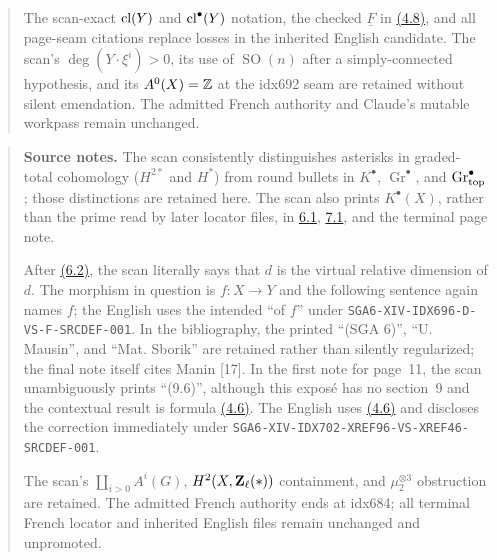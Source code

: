 \begin{quote}
The scan-exact $\operatorname{cl}(Y)$ and $\operatorname{cl}^\bullet(Y)$ notation, the checked
$\underline F$ in \hyperlink{sga6.e14.para.4-8}{(4.8)}, and all page-seam citations replace losses in the
inherited English candidate. The scan's $\deg(Y\cdot\xi^i)>0$, its use of
$\operatorname{SO}(n)$ after a simply-connected hypothesis, and its
$A^0(X)=\mathbb Z$ at the idx692 seam are retained without silent emendation.
The admitted French authority and Claude's mutable workpass remain
unchanged.
\end{quote}

\begin{quote}\footnotesize\raggedright
\textbf{Source notes.}
The scan consistently distinguishes asterisks in graded-total cohomology
($H^{2*}$ and $H^*$) from round bullets in $K^\bullet$,
$\operatorname{Gr}^\bullet$, and $\operatorname{Gr}_{\mathrm{top}}^\bullet$; those distinctions are
retained here. The scan also prints $K^\bullet(X)$, rather than the prime
read by later locator files, in \hyperlink{sga6.e14.para.6-1}{6.1}, \hyperlink{sga6.e14.para.7-1}{7.1}, and the terminal page note.

After \hyperlink{sga6.e14.para.6-2}{(6.2)}, the scan literally says that $d$ is the virtual relative
dimension of $d$. The morphism in question is $f:X\to Y$ and the following
sentence again names $f$; the English uses the intended ``of $f$'' under
\nolinkurl{SGA6-XIV-IDX696-D-VS-F-SRCDEF-001}. In the bibliography, the
printed ``(SGA 6)'', ``U. Mausin'', and ``Mat. Sborik'' are retained rather
than silently regularized; the final note itself cites Manin [17]. In the
first note for page~11, the scan unambiguously prints ``(9.6)'', although
this expos\'e has no section~9 and the contextual result is formula \hyperlink{sga6.e14.eq.4-6}{(4.6)}.
The English uses \hyperlink{sga6.e14.para.4-6}{(4.6)} and discloses the correction immediately under
\nolinkurl{SGA6-XIV-IDX702-XREF96-VS-XREF46-SRCDEF-001}.

The scan's $\coprod_{i>0}A^i(G)$, $H^2(X,\mathbf Z_\ell(*))$ containment, and
$\mu_2^{\otimes3}$ obstruction are retained. The admitted French authority
ends at idx684; all terminal French locator and inherited English files
remain unchanged and unpromoted.
\end{quote}
